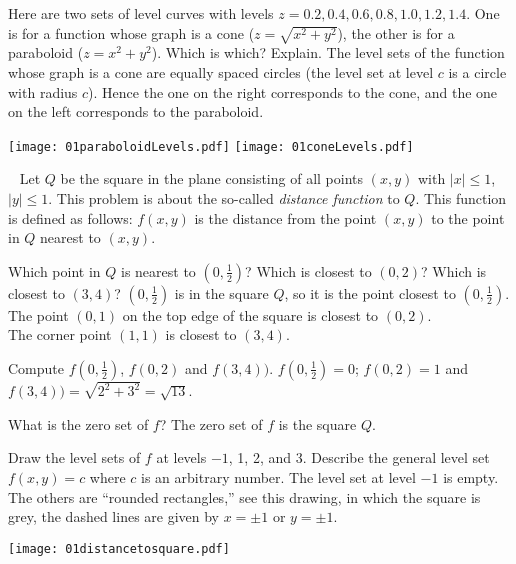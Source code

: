 \begin{multicols}{2}
\problem\label{prb:cone-or-paraboloid}
Here are two sets of level curves with levels $z=0.2, 0.4, 0.6, 0.8,
1.0, 1.2,  1.4$.  One is for a function whose graph is a cone
($z=\sqrt{x^2+y^2}$), the other is for a paraboloid ($z=x^2+y^2$).
Which is which? Explain.
\answer
The level sets of the function whose graph is a cone are equally spaced circles
(the level set at level $c$ is a circle with radius $c$).  Hence the one on the
right corresponds to the cone, and
the one on the left corresponds to the paraboloid.
\endanswer
\begin{center}
  \texttt{[image: 01paraboloidLevels.pdf]}
  \quad
  \texttt{[image: 01coneLevels.pdf]}
\end{center}

\problem\label{prb:distance-to-square-level-sets}
\carefulnow~
Let $Q$ be the square in the plane consisting of all points $(x,y)$
with $|x|\le1$, $|y|\le1$.  This problem is about the so-called
\emph{distance function} to $Q$.  This function is defined as
follows:  $f(x, y)$ is the distance from the point $(x,y)$ to the
point in $Q$ nearest to $(x,y)$.

\subprob Which point in $Q$ is nearest to $(0, \frac12)$?  Which is
closest to $(0, 2)$?  Which is closest to $(3,4)$?
\answer
$(0, \frac{1} {2})$ is in the square $Q$, so it is the point closest to
$(0, \frac{1} {2})$.\\
The point $(0,1)$ on the top edge of the square is closest to $(0,2)$.\\
The corner point $(1,1)$ is closest to $(3,4)$.
\endanswer

\subprob Compute $f(0, \frac12)$, $f(0,2)$ and $f(3, 4))$.
\answer
$f(0, \frac12) =0 $;
$f(0,2)=1$ and $f(3, 4))=\sqrt{2^2+3^2}=\sqrt{13}$.
\endanswer

\subprob What is the zero set of $f$?
\answer
The zero set of $f$ is the square $Q$.
\endanswer

\subprob Draw the level sets of $f$ at levels $-1$, 1, 2, and 3.  Describe
the general level set $f(x, y) = c$ where $c$ is an arbitrary number.
\answer
The level set at level $-1$ is empty.  The others are ``rounded
rectangles,'' see this drawing, in which the square is grey, the dashed
lines are given by $x=\pm1$ or $y=\pm1$.
\begin{center}
    \texttt{[image: 01distancetosquare.pdf]}
\end{center}
\endanswer


\end{multicols}
